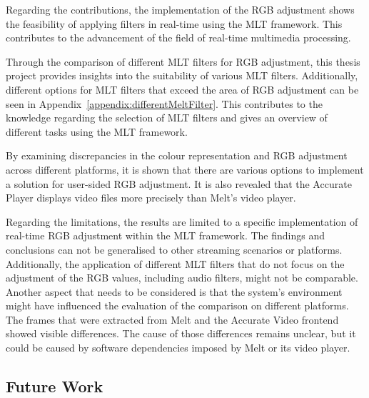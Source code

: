 \documentclass[../MasterThesis.tex]{subfiles}
\begin{document}
Regarding the contributions, the implementation of the RGB adjustment shows the feasibility of applying filters in real-time using the MLT framework.
This contributes to the advancement of the field of real-time multimedia processing.


Through the comparison of different MLT filters for RGB adjustment, this thesis project provides insights into the suitability of various MLT filters. Additionally, different options for MLT filters that exceed the area of RGB adjustment can be seen in Appendix~\ref{appendix:differentMeltFilter}.
This contributes to the knowledge regarding the selection of MLT filters and gives an overview of different tasks using the MLT framework.


By examining discrepancies in the colour representation and RGB adjustment across different platforms, it is shown that there are various options to implement a solution for user-sided RGB adjustment. It is also revealed that the Accurate Player displays video files more precisely than Melt's video player.


Regarding the limitations, the results are limited to a specific implementation of real-time RGB adjustment within the MLT framework. The findings and conclusions can not be generalised to other streaming scenarios or platforms. 
Additionally, the application of different MLT filters that do not focus on the adjustment of the RGB values, including audio filters, might not be comparable. 
%
Another aspect that needs to be considered is that the system's environment might have influenced the evaluation of the comparison on different platforms. The frames that were extracted from Melt and the Accurate Video frontend showed visible differences. The cause of those differences remains unclear, but it could be caused by software dependencies imposed by Melt or its video player.

	

	
	
	
	





\subsection{Future Work} \label{subsection:futurework}
\end{document}
